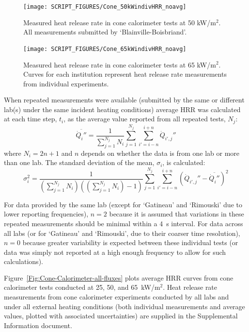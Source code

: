 \documentclass{book}
\begin{document}
\begin{figure}
  \centering
  \texttt{[image: SCRIPT\_FIGURES/Cone\_50kWindivHRR\_noavg]}
  \caption{Measured heat release rate in cone calorimeter tests at 50 kW/m$^2$. All measurements submitted by ‘Blainville-Boisbriand’.}
  \label{Fig:Cone_50kWindivHRR}
\end{figure}

\begin{figure}
  \centering
  \texttt{[image: SCRIPT\_FIGURES/Cone\_65kWindivHRR\_noavg]}
  \caption{Measured heat release rate in cone calorimeter tests at 65 kW/m$^2$. Curves for each institution represent heat release rate measurements from individual experiments.}
  \label{Fig:Cone_65kWindivHRR}
\end{figure}

When repeated measurements were available (submitted by the same or different lab(s) under the same incident heating conditions) average HRR was calculated at each time step, $t_i$, as the average value reported from all repeated tests, $N_j$:
\begin{equation}
  \overline{\dot{Q}_i''} = \frac{1}{\sum_{j=1}^{N_j}N_i} \sum_{j=1}^{N_j} \sum_{i'=i-n}^{i+n} \dot{Q}_{i',j}''
\end{equation}
where $N_i=2n+1$ and $n$ depends on whether the data is from one lab or more than one lab. The standard deviation of the mean, $\sigma_i$, is calculated:
\begin{equation}
   \sigma_i^2 = \frac{1}{(\sum_{j=1}^{N_j}N_i)((\sum_{j=1}^{N_j}N_i)-1)}   \sum_{j=1}^{N_j} \sum_{i'=i-n}^{i+n} \left( \dot{Q}_{i',j}'' - \overline{\dot{Q}_i''} \right)^2
\end{equation}

For data provided by the same lab (except for ‘Gatineau’ and ‘Rimouski’ due to lower reporting frequencies), $n=2$ because it is assumed that variations in these repeated measurements should be minimal within a 4~s interval. For data across all labs (or for ‘Gatineau’ and ‘Rimouski’, due to their coarser time resolution), $n=0$ because greater variability is expected between these individual tests (or data was simply not reported at a high enough frequency to allow for such calculations).


Figure~\ref{Fig:Cone-Calorimeter-all-fluxes} plots average HRR curves from cone calorimeter tests conducted at 25, 50, and 65~kW/m$^2$. Heat release rate measurements from cone calorimeter experiments conducted by all labs and under all external heating conditions (both individual measurements and average values, plotted with associated uncertainties) are supplied in the Supplemental Information document.
\end{document}

